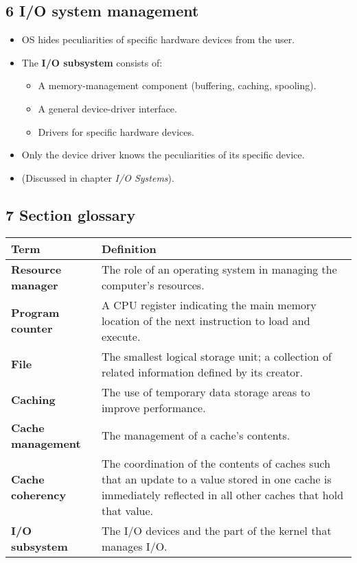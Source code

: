 \documentclass{article}
\begin{document}
\subsection*{6 I/O system management}
\begin{itemize}
    \item OS hides peculiarities of specific hardware devices from the user.
    \item The \textbf{I/O subsystem} consists of:
    \begin{itemize}
        \item A memory-management component (buffering, caching, spooling).
        \item A general device-driver interface.
        \item Drivers for specific hardware devices.
    \end{itemize}
    \item Only the device driver knows the peculiarities of its specific device.
    \item (Discussed in chapter \textit{I/O Systems}).
\end{itemize}

\subsection*{7 Section glossary}
\centering
\begin{tabular}{>{\raggedright}p{} >{\raggedright\arraybackslash}p{}}
\toprule
\textbf{Term} & \textbf{Definition} \\
\midrule
\textbf{Resource manager} & The role of an operating system in managing the computer's resources. \\
\textbf{Program counter} & A CPU register indicating the main memory location of the next instruction to load and execute. \\
\textbf{File} & The smallest logical storage unit; a collection of related information defined by its creator. \\
\textbf{Caching} & The use of temporary data storage areas to improve performance. \\
\textbf{Cache management} & The management of a cache's contents. \\
\textbf{Cache coherency} & The coordination of the contents of caches such that an update to a value stored in one cache is immediately reflected in all other caches that hold that value. \\
\textbf{I/O subsystem} & The I/O devices and the part of the kernel that manages I/O. \\
\bottomrule
\end{tabular}
\vspace{\baselineskip}
\end{document}
